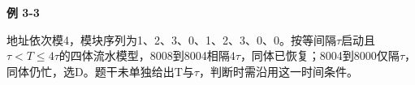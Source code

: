 {\color{ink}\bfseries 例 3-3}\par\vspace{1bp}地址依次模4，模块序列为1、2、3、0、1、2、3、0、0。按等间隔\(\tau \)启动且\(\tau <\allowbreak{}T\le 4\tau \)的四体流水模型，8008到8004相隔\(4\tau \)，同体已恢复；8004到8000仅隔\(\tau \)，同体仍忙，选D。题干未单独给出T与\(\tau \)，判断时需沿用这一时间条件。
